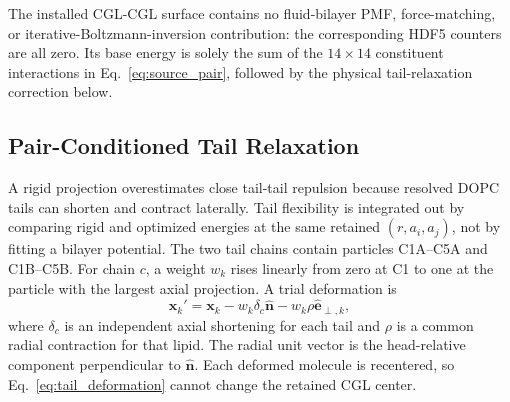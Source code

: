 \documentclass{article}
\begin{document}
The installed CGL-CGL surface contains no fluid-bilayer PMF, force-matching, or
iterative-Boltzmann-inversion contribution: the corresponding HDF5 counters
are all zero.  Its base energy is solely the sum of the $14\times14$
constituent interactions in Eq.~\ref{eq:source_pair}, followed by the physical
tail-relaxation correction below.

\subsection{Pair-Conditioned Tail Relaxation}

A rigid projection overestimates close tail-tail repulsion because resolved
DOPC tails can shorten and contract laterally.  Tail flexibility is integrated
out by comparing rigid and optimized energies at the same retained
$(r,a_i,a_j)$, not by fitting a bilayer potential.  The two tail chains contain
particles C1A--C5A and C1B--C5B.  For chain $c$, a weight $w_k$ rises linearly
from zero at C1 to one at the particle with the largest axial projection.  A
trial deformation is
\begin{equation}
\mathbf x_k'=\mathbf x_k-w_k\delta_c\hat{\mathbf n}
-w_k\rho\hat{\mathbf e}_{\perp,k},
\label{eq:tail_deformation}
\end{equation}
where $\delta_c$ is an independent axial shortening for each tail and $\rho$
is a common radial contraction for that lipid.  The radial unit vector is the
head-relative component perpendicular to $\hat{\mathbf n}$.  Each deformed
molecule is recentered, so Eq.~\ref{eq:tail_deformation} cannot change the
retained CGL center.
\end{document}
